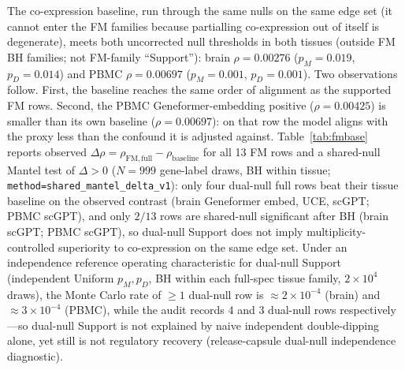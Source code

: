 \documentclass[fleqn,10pt,lineno]{wlpeerj}
\begin{document}
The co-expression baseline, run through the same nulls on the same edge set (it cannot enter the
FM families because partialling co-expression out of itself is degenerate), meets both uncorrected
null thresholds in both tissues (outside FM BH families; not FM-family ``Support''): brain
$\rho=0.00276$ ($p_M=0.019$, $p_D=0.014$) and PBMC $\rho=0.00697$
($p_M=0.001$, $p_D=0.001$). Two observations follow. First, the baseline reaches the same order of
alignment as the supported FM rows. Second, the PBMC Geneformer-embedding positive
($\rho=0.00425$) is smaller than its own baseline ($\rho=0.00697$): on that row the model aligns
with the proxy less than the confound it is adjusted against.
Table~\ref{tab:fmbase} reports observed
$\Delta\rho=\rho_{\mathrm{FM,full}}-\rho_{\mathrm{baseline}}$ for all 13 FM rows and a shared-null
Mantel test of $\Delta>0$ ($N{=}999$ gene-label draws, BH within tissue;
\texttt{method=shared\_mantel\_delta\_v1}): only four dual-null full rows beat their tissue baseline
on the observed contrast (brain Geneformer embed, UCE, scGPT; PBMC scGPT), and only
$2/13$ rows are shared-null significant after BH (brain scGPT; PBMC scGPT), so dual-null Support
does not imply multiplicity-controlled superiority to co-expression on the same edge set.
Under an independence reference operating characteristic for dual-null Support (independent
Uniform $p_M,p_D$, BH within each full-spec tissue family, $2\times10^{4}$ draws), the Monte Carlo
rate of $\ge1$ dual-null row is $\approx2\times10^{-4}$ (brain) and $\approx3\times10^{-4}$ (PBMC),
while the audit records 4 and 3 dual-null rows respectively---so dual-null Support is not explained
by naive independent double-dipping alone, yet still is not regulatory recovery
(release-capsule dual-null independence diagnostic).

\begin{table}[!tbp]\centering
\resizebox{\linewidth}{!}{}
\caption{FM versus same-edge co-expression baseline under the full confound design.
The $\rho_{\mathrm{FM}}$ column is the shared-null pipeline recompute
(\texttt{method=shared\_mantel\_delta\_v1}); small differences from the primary fixed-panel $\rho$ values
reflect that recompute, not a second primary estimand.
$\Delta\rho=\rho_{\mathrm{FM}}-\rho_{\mathrm{base}}$ is the observed contrast; $q_{\Delta}$ and
Shared sig are one-sided shared-null Mantel tests of $\Delta>0$ ($N{=}999$, BH within tissue).
Dual-null is the primary Support gate (both within-family BH $q_M<0.05$ and $q_D<0.05$). Dual$\wedge$beats counts rows that are
dual-null \emph{and} have observed $\Delta\rho>0$ ($4/7$ dual-null rows; $4/13$ FM rows overall);
shared-null significance is $2/13$ (brain/PBMC scGPT only).}\label{tab:fmbase}
\end{table}
\end{document}
